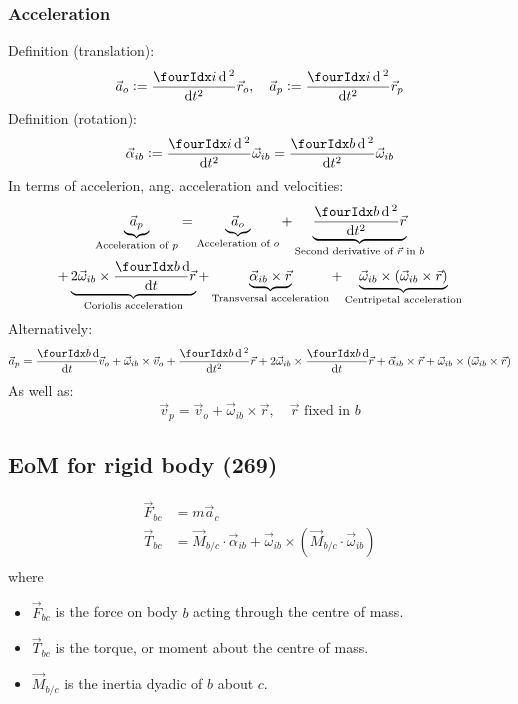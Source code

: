 \documentclass[a4paper, 12pt]{article}
\begin{document}
\subsubsection{Acceleration}
Definition (translation):
\begin{equation}
	\vec{a}_o := \frac{\presuper{i}\dif\,^2}{\dif t^2} \vec{r}_o, \quad 
	\vec{a}_p := \frac{\presuper{i}\dif\,^2}{\dif t^2} \vec{r}_p
\end{equation}
Definition (rotation):
\begin{equation}
	\vec{\alpha}_{ib} := \frac{\presuper{i}\dif\,^2}{\dif t^2} \vec{\omega}_{ib}
	= \frac{\presuper{b}\dif\,^2}{\dif t^2} \vec{\omega}_{ib}
\end{equation}
In terms of accelerion, ang. acceleration and velocities:
\begin{multline}
		\underbrace{\vec{a}_p}_{\text{Acceleration of \(p\)}} =
		\underbrace{\vec{a}_o}_{\text{Acceleration of \(o\)}} +
		\underbrace{\frac{\presuper{b}\dif\,^2}{\dif t^2} \vec{r}}_{\text{Second derivative of \(\vec{r}\) in \(b\)}} \\ +
		\underbrace{2 \vec{\omega}_{ib} \times \frac{\presuper{b}\dif}{\dif t} \vec{r} }_{\text{Coriolis acceleration}} +
		\underbrace{\vec{\alpha}_{ib} \times \vec{r}}_{\text{Transversal acceleration}} +
		\underbrace{\vec{\omega}_{ib} \times \left( \vec{\omega}_{ib} \times \vec{r} \right)}_{\text{Centripetal acceleration}}
\end{multline}
Alternatively:
\begin{equation}
	\vec{a}_p =
	\frac{\presuper{b}\dif}{\dif t} \vec{v}_o +
	\vec{\omega}_{ib} \times \vec{v}_o +
	\frac{\presuper{b}\dif\,^2}{\dif t^2} \vec{r} +
	2 \vec{\omega}_{ib} \times \frac{\presuper{b}\dif}{\dif t} \vec{r} +
	\vec{\alpha}_{ib} \times \vec{r} +
	\vec{\omega}_{ib} \times \left( \vec{\omega}_{ib} \times \vec{r} \right)
\end{equation}
As well as:
\begin{equation}
	\vec{v}_p = \vec{v}_o + \vec{\omega}_{ib} \times \vec{r},
	\quad \vec{r} \text{ fixed in } b
\end{equation}

\subsection{EoM for rigid body (269)}
\begin{equation}
	\begin{aligned}
		\vec{F}_{bc} &= m \vec{a}_c \\
		\vec{T}_{bc} &= \vec{M}_{b/c} \cdot \vec{\alpha}_{ib}
		+ \vec{\omega}_{ib} \times ( \vec{M}_{b/c} \cdot \vec{\omega}_{ib}) \\
	\end{aligned}
\end{equation}
where
\begin{itemize}
	\item \( \vec{F}_{bc} \) is the force on body \( b \) acting through the centre of mass.
	\item \( \vec{T}_{bc} \) is the torque, or moment about the centre of mass.
	\item \( \vec{M}_{b/c} \) is the inertia dyadic of \( b \) about \( c \).
\end{itemize}
\end{document}
